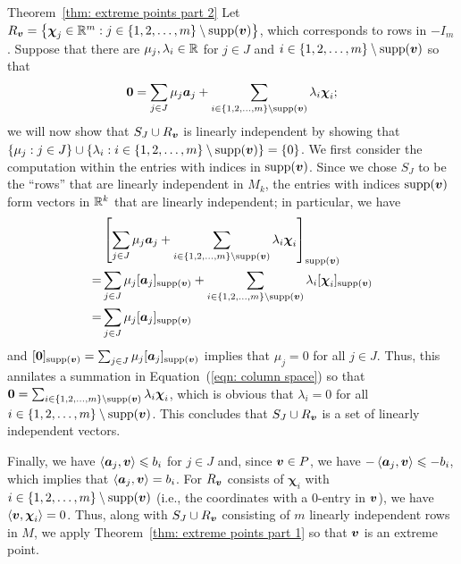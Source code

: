 \begin{proofof}{Theorem~\ref{thm: extreme points part 2}}
Let $R_{\boldsymbol v} = \left\{\boldsymbol\chi_j\in\mathbb R^m: j\in \{1,2,\dots, m\}\setminus \operatorname{supp}({\boldsymbol v})\right\}$, which corresponds to rows in $-I_m$. Suppose that there are $\mu_j, \lambda_i \in\mathbb R$ for $j\in J$ and $i\in \{1,2,\dots, m\}\setminus \operatorname{supp}({\boldsymbol v})$ so that 
\begin{equation}\label{eqn: column space}\boldsymbol0 =  \sum_{j\in J} \mu_j {\boldsymbol a}_j + \sum_{i\in \{1,2,\dots, m\}\setminus \operatorname{supp}({\boldsymbol v})} \lambda_i \boldsymbol\chi_i; \end{equation}
we will now show that $S_J \cup R_{\boldsymbol v}$ is linearly independent by showing that $\{\mu_j: j\in J\}\cup \{\lambda_i: i\in \{1,2,\dots, m\}\setminus \operatorname{supp}({\boldsymbol v})\} =\{ 0\}$.  
We first consider the computation within the entries with indices in $\operatorname{supp}({\boldsymbol v})$. Since we chose $S_J$ to be the ``rows'' that are linearly independent in $M_k$, the entries with indices $\operatorname{supp}({\boldsymbol v})$ form vectors in $\mathbb R^k$ that are linearly independent; in particular, we have 
\begin{equation*}\begin{split} 
&  \left[\sum_{j\in J} \mu_j {\boldsymbol a}_j + \sum_{i\in \{1,2,\dots, m\}\setminus \operatorname{supp}({\boldsymbol v})} \lambda_i \boldsymbol\chi_i\right]_{\operatorname{supp}({\boldsymbol v})} \\
 = &  \sum_{j\in J} \mu_j [{\boldsymbol a}_j]_{\operatorname{supp}({\boldsymbol v})} + \sum_{i\in \{1,2,\dots, m\}\setminus \operatorname{supp}({\boldsymbol v})} \lambda_i [\boldsymbol\chi_i]_{\operatorname{supp}({\boldsymbol v})}\\ 
 = &  \sum_{j\in J} \mu_j [{\boldsymbol a}_j]_{\operatorname{supp}({\boldsymbol v})}
\end{split}\end{equation*}
and $[\boldsymbol0]_{\operatorname{supp}({\boldsymbol v})} = \sum_{j\in J} \mu_j [{\boldsymbol a}_j]_{\operatorname{supp}({\boldsymbol v})}$ implies that $\mu_j = 0$ for all $j\in J$. Thus, this annilates a summation in Equation~(\ref{eqn: column space}) so that $\boldsymbol0 =  \sum_{i\in \{1,2,\dots, m\}\setminus \operatorname{supp}({\boldsymbol v})} \lambda_i \boldsymbol\chi_i$, which is obvious that $\lambda_i = 0$ for all $i\in\{1,2,\dots, m\}\setminus\operatorname{supp}({\boldsymbol v})$. This concludes that $S_J \cup R_{\boldsymbol v}$ is a set of linearly independent vectors. 

Finally, we have $\left\langle{\boldsymbol a}_j, {\boldsymbol v}\right\rangle\leqslant b_i$ for $j\in J$ and, since ${\boldsymbol v}\in P$, we have $- \left\langle{\boldsymbol a}_j, {\boldsymbol v}\right\rangle\leqslant -b_i$, which implies that $\left\langle{\boldsymbol a}_j, {\boldsymbol v}\right\rangle = b_i$. For $R_{\boldsymbol v}$ consists of $\bm\chi_i$ with $i\in\{1, 2, \dots, m\}\setminus\operatorname{supp}({\boldsymbol v})$ (i.e., the coordinates with a 0-entry in ${\boldsymbol v}$), we have $\left\langle{\boldsymbol v}, \boldsymbol\chi_i\right\rangle = 0$. Thus, along with $S_J\cup R_{\boldsymbol v}$ consisting of $m$ linearly independent rows in $M$, we apply Theorem~\ref{thm: extreme points part 1} so that ${\boldsymbol v}$ is an extreme point. 
\end{proofof}



